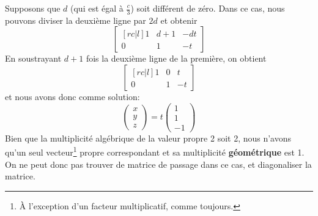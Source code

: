 Supposons que $d$ (qui est égal à $\frac{c}{3}$) soit différent de zéro.  Dans ce cas,
nous pouvons diviser la deuxième ligne par $2d$ et obtenir
\[
\begin{bmatrix}[rc|l]
1 & d+1 & -dt\\
0 & 1 & -t
\end{bmatrix}
\]
En soustrayant $d+1$ fois la deuxième ligne de la première, on obtient
\[
\begin{bmatrix}[rc|l]
1 & 0 & t\\
0 & 1 & -t
\end{bmatrix}
\]
et nous avons donc comme solution:
\[
\begin{pmatrix}
x \\ y \\ z
\end{pmatrix}
= t\begin{pmatrix}
1 \\ 1 \\ -1
\end{pmatrix}
\]
Bien que la multiplicité algébrique de la valeur propre 2 soit 2, nous n'avons qu'un
seul vecteur\footnote{À l'exception d'un facteur multiplicatif, comme toujours.} 
propre correspondant et sa multiplicité \textbf{géométrique} est 1.  On ne peut
donc pas trouver de matrice de passage dans ce cas, et diagonaliser la matrice.

